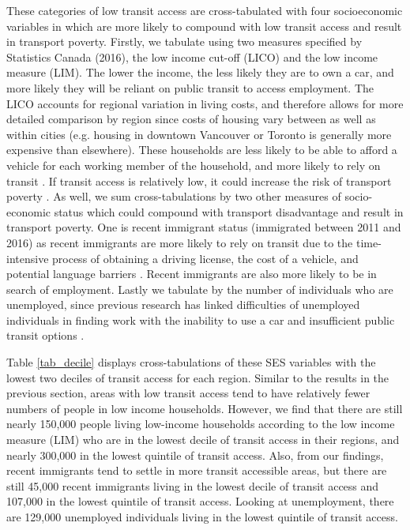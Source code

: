 \documentclass[11 pt, letterpaper]{article}
\begin{document}
{These categories of low transit access are cross-tabulated with four socioeconomic variables in which are more likely to compound with low transit access and result in transport poverty. Firstly, we tabulate using two measures specified by Statistics Canada (2016), the low income cut-off (LICO) and the low income measure (LIM). The lower the income, the less likely they are to own a car, and more likely they will be reliant on public transit to access employment. The LICO accounts for regional variation in living costs, and therefore allows for more detailed comparison by region since costs of housing vary between as well as within cities (e.g. housing in downtown Vancouver or Toronto is generally more expensive than elsewhere). These households are less likely to be able to afford a vehicle for each working member of the household, and more likely to rely on transit \cite{seu2003}. If transit access is relatively low, it could increase the risk of transport poverty \cite{lucas2012}. As well, we sum cross-tabulations by two other measures of socio-economic status which could compound with transport disadvantage and result in transport poverty. One is recent immigrant status (immigrated between 2011 and 2016) as recent immigrants are more likely to rely on transit due to the time-intensive process of obtaining a driving license, the cost of a vehicle, and potential language barriers \cite{lo2011,farber2018}. Recent immigrants are also more likely to be in search of employment. Lastly we tabulate by the number of individuals who are unemployed, since previous research has linked difficulties of unemployed individuals in finding work with the inability to use a car and insufficient public transit options \cite{seu2003,merlin2017}. 

Table \ref{tab_decile} displays cross-tabulations of these SES variables with the lowest two deciles of transit access for each region. Similar to the results in the previous section, areas with low transit access tend to have relatively fewer numbers of people in low income households. However, we find that there are still nearly 150,000 people living low-income households according to the low income measure (LIM) who are in the lowest decile of transit access in their regions, and nearly 300,000 in the lowest quintile of transit access. Also, from our findings, recent immigrants tend to settle in more transit accessible areas, but there are still 45,000 recent immigrants living in the lowest decile of transit access and 107,000 in the lowest quintile of transit access. Looking at unemployment, there are 129,000 unemployed individuals living in the lowest quintile of transit access. 




}
\end{document}
